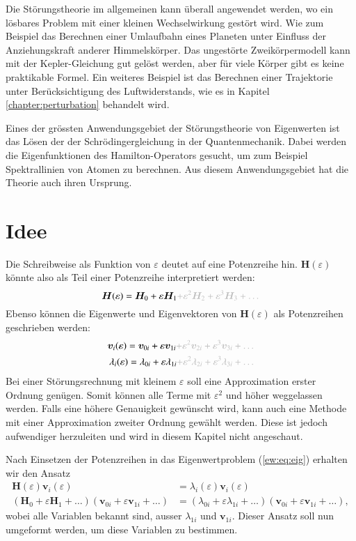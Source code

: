 Die Störungstheorie im allgemeinen kann überall angewendet werden, wo ein lösbares Problem mit einer kleinen Wechselwirkung gestört wird.
Wie zum Beispiel das Berechnen einer Umlaufbahn eines Planeten unter Einfluss der Anziehungskraft anderer Himmelskörper.
Das ungestörte Zweikörpermodell kann mit der Kepler-Gleichung gut gelöst werden, aber für viele Körper gibt es keine praktikable Formel.
Ein weiteres Beispiel ist das Berechnen einer Trajektorie unter Berücksichtigung des Luftwiderstands, wie es in Kapitel \ref{chapter:perturbation} behandelt wird.

Eines der grössten Anwendungsgebiet der Störungstheorie von Eigenwerten ist das Lösen der der Schrödingergleichung in der Quantenmechanik.
Dabei werden die Eigenfunktionen des Hamilton-Operators gesucht, um zum Beispiel Spektrallinien von Atomen zu berechnen.
Aus diesem Anwendungsgebiet hat die Theorie auch ihren Ursprung.

\section{Idee}

Die Schreibweise als Funktion von $\varepsilon$ deutet auf eine Potenzreihe hin.
$\bm H(\varepsilon)$ könnte also als Teil einer Potenzreihe interpretiert werden:
\begin{equation*}
    \bm H(\varepsilon) = \bm H_0 + \varepsilon \bm H_1 \GR{ + \varepsilon^2 \bm H_2  + \varepsilon^3 \bm H_3 + \dots}
\end{equation*}
Ebenso können die Eigenwerte und Eigenvektoren von $\bm H(\varepsilon)$ als Potenzreihen geschrieben werden:
\begin{align}
    \bm v_i(\varepsilon) = \bm v_{0i} + \varepsilon \bm v_{1i} \GR{ + \varepsilon^2 \bm v_{2i}  + \varepsilon^3 \bm v_{3i} + \dots} \label{ew:eq:eigvec} \\
    \lambda_i(\varepsilon) = \lambda_{0i} + \varepsilon \lambda_{1i} \GR{ + \varepsilon^2 \lambda_{2i}  + \varepsilon^3 \lambda_{3i} + \dots}  \label{ew:eq:eigval}
\end{align}
Bei einer Störungsrechnung mit kleinem $\varepsilon$ soll eine Approximation erster Ordnung genügen.
Somit können alle Terme mit $\varepsilon^2$ und höher weggelassen werden.
Falls eine höhere Genauigkeit gewünscht wird, kann auch eine Methode mit einer Approximation zweiter Ordnung gewählt werden.
Diese ist jedoch aufwendiger herzuleiten und wird in diesem Kapitel nicht angeschaut.

Nach Einsetzen der Potenzreihen in das Eigenwertproblem (\eqref{ew:eq:eig}) erhalten wir den Ansatz
\begin{align}
    \bm H(\varepsilon) \bm v_i(\varepsilon)
    &=
    \lambda_i(\varepsilon) \bm v_i(\varepsilon) \\
    (\bm H_0 + \varepsilon \bm H_1 + \dots)
    (\bm v_{0i} + \varepsilon \bm v_{1i} + \dots)
    &=
    (\lambda_{0i} + \varepsilon \lambda_{1i} + \dots)
    (\bm v_{0i} + \varepsilon \bm v_{1i} + \dots),
\end{align}
wobei alle Variablen bekannt sind, ausser $\lambda_{1i}$ und $\bm v_{1i}$.
Dieser Ansatz soll nun umgeformt werden, um diese Variablen zu bestimmen.

